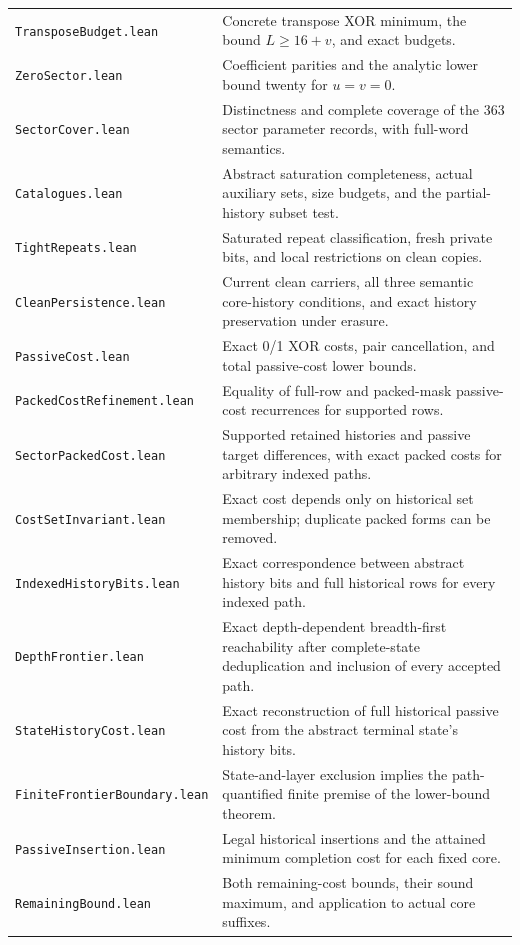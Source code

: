 \documentclass[11pt]{article}
\begin{document}
{\begin{longtable}{@{}p{.40\linewidth}p{.56\linewidth}@{}}
\texttt{TransposeBudget.lean}&Concrete transpose XOR minimum, the bound
$L\geq16+v$, and exact budgets.\\
\texttt{ZeroSector.lean}&Coefficient parities and the analytic lower
bound twenty for $u=v=0$.\\
\texttt{SectorCover.lean}&Distinctness and complete coverage of the 363
sector parameter records, with full-word semantics.\\
\texttt{Catalogues.lean}&Abstract saturation completeness, actual auxiliary
sets, size budgets, and the partial-history subset test.\\
\texttt{TightRepeats.lean}&Saturated repeat classification, fresh private
bits, and local restrictions on clean copies.\\
\texttt{CleanPersistence.lean}&Current clean carriers, all three semantic
core-history conditions, and exact history preservation under erasure.\\
\texttt{PassiveCost.lean}&Exact 0/1 XOR costs, pair cancellation, and total
passive-cost lower bounds.\\
\texttt{PackedCostRefinement.lean}&Equality of full-row and packed-mask
passive-cost recurrences for supported rows.\\
\texttt{SectorPackedCost.lean}&Supported retained histories and passive
target differences, with exact packed costs for arbitrary indexed paths.\\
\texttt{CostSetInvariant.lean}&Exact cost depends only on historical set
membership; duplicate packed forms can be removed.\\
\texttt{IndexedHistoryBits.lean}&Exact correspondence between abstract
history bits and full historical rows for every indexed path.\\
\texttt{DepthFrontier.lean}&Exact depth-dependent breadth-first reachability
after complete-state deduplication and inclusion of every accepted path.\\
\texttt{StateHistoryCost.lean}&Exact reconstruction of full historical
passive cost from the abstract terminal state's history bits.\\
\texttt{FiniteFrontierBoundary.lean}&State-and-layer exclusion implies
the path-quantified finite premise of the lower-bound theorem.\\
\texttt{PassiveInsertion.lean}&Legal historical insertions and the attained
minimum completion cost for each fixed core.\\
\texttt{RemainingBound.lean}&Both remaining-cost bounds, their sound
maximum, and application to actual core suffixes.\\

\end{longtable}}
\end{document}
